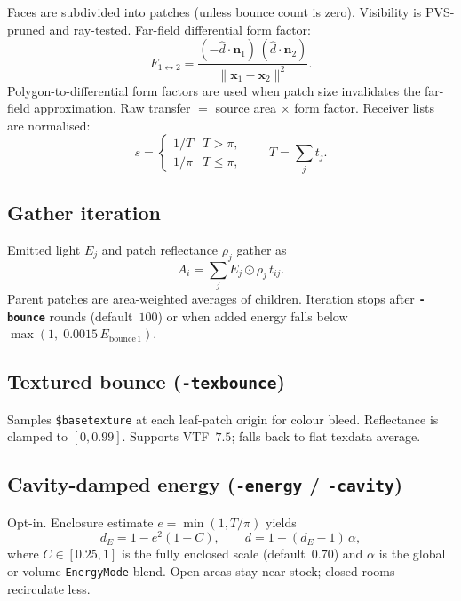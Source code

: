 \documentclass[11pt,a4paper]{article}
\newcommand{\flag}[1]{\texttt{\bfseries #1}}
\newcommand{\vmt}[1]{\texttt{\$#1}}
\newcommand{\code}[1]{\texttt{#1}}
\newcommand{\vect}[1]{\bm{#1}}
\begin{document}
Faces are subdivided into patches (unless bounce count is zero). Visibility is
PVS-pruned and ray-tested. Far-field differential form factor:
\begin{equation}
  F_{1\leftrightarrow 2}
  =
  \frac{(-\hat{d}\cdot\vect{n}_1)\,(\hat{d}\cdot\vect{n}_2)}
       {\|\vect{x}_1-\vect{x}_2\|^{2}}.
\end{equation}
Polygon-to-differential form factors are used when patch size invalidates the
far-field approximation. Raw transfer $=$ source area $\times$ form factor.
Receiver lists are normalised:
\begin{equation}
  s
  =
  \begin{cases}
    1/T & T>\pi,\\
    1/\pi & T\le\pi,
  \end{cases}
  \qquad
  T=\sum_j t_j.
\end{equation}

\subsection{Gather iteration}

Emitted light $E_j$ and patch reflectance $\rho_j$ gather as
\begin{equation}
  A_i = \sum_j E_j \odot \rho_j\, t_{ij}.
\end{equation}
Parent patches are area-weighted averages of children. Iteration stops after
\flag{-bounce} rounds (default~$100$) or when added energy falls below
$\max(1,\;0.0015\,E_{\mathrm{bounce\,1}})$.

\subsection{Textured bounce (\flag{-texbounce})}

Samples \vmt{basetexture} at each leaf-patch origin for colour bleed.
Reflectance is clamped to $[0,0.99]$. Supports VTF~$7.5$; falls back to flat
texdata average.

\subsection{Cavity-damped energy (\flag{-energy} / \flag{-cavity})}

Opt-in. Enclosure estimate $e=\min(1,T/\pi)$ yields
\begin{equation}
  d_E = 1 - e^{2}(1-C),
  \qquad
  d = 1+(d_E-1)\,\alpha,
\end{equation}
where $C\in[0.25,1]$ is the fully enclosed scale (default~$0.70$) and $\alpha$
is the global or volume \code{EnergyMode} blend. Open areas stay near stock;
closed rooms recirculate less.
\end{document}
